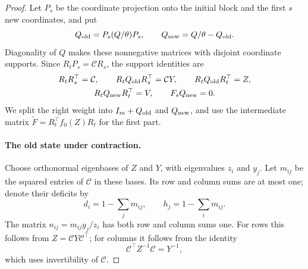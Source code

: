 \begin{proof}
Let $P_s$ be the coordinate projection onto the initial block and
the first $s$ new coordinates, and put
\[
 Q_{\rm old}=P_s(Q/\theta)P_s,
 \qquad Q_{\rm new}=Q/\theta-Q_{\rm old}.
\]
Diagonality of $Q$ makes these nonnegative matrices with disjoint
coordinate supports.  Since $R_tP_s=\mathcal C R_s$, the support identities are
\begin{equation}
 \begin{gathered}
 R_tR_s^\top=\mathcal C,\qquad
 R_tQ_{\rm old}R_s^\top=\mathcal C Y,\qquad
 R_tQ_{\rm old}R_t^\top=Z,\\
 R_tQ_{\rm new}R_t^\top=V,\qquad F_sQ_{\rm new}=0.
 \end{gathered}
 \label{eq:old-new-support}
\end{equation}
We split the right weight into $I_m+Q_{\rm old}$ and
$Q_{\rm new}$, and use the intermediate matrix
$\widetilde F=R_t^\top f_0(Z)R_t$ for the first part.

\paragraph{The old state under contraction.}
Choose orthonormal eigenbases of $Z$ and $Y$, with eigenvalues
$z_i$ and $y_j$.  Let $m_{ij}$ be the squared entries of $\mathcal C$ in
these bases.  Its row and column sums are at most one; denote their
deficits by
\[
 d_i=1-\sum_jm_{ij},\qquad h_j=1-\sum_im_{ij}.
\]
The matrix $n_{ij}=m_{ij}y_j/z_i$ has both row and column sums one.
For rows this follows from $Z=\mathcal C Y\mathcal C^\top$; for columns it follows
from the identity
\[
 \mathcal C^\top Z^{-1}\mathcal C=Y^{-1},
\]
which uses invertibility of $\mathcal C$.


\end{proof}
